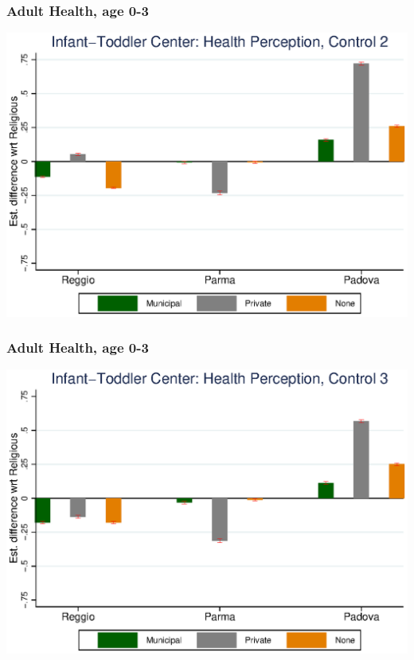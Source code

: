 \documentclass{beamer}
\begin{document}
\begin{frame}\frametitle{Adult Health, age 0-3}
\center
\includegraphics[scale=0.7]{../Output/graphs/H_Asilo_Adult_inter.eps}
\end{frame}

\begin{frame}\frametitle{Adult Health, age 0-3}
\center
\includegraphics[scale=0.7]{../Output/graphs/H_Asilo_Adult_right.eps}
\end{frame}
\end{document}
